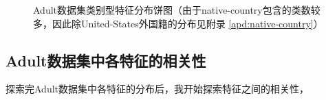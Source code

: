 \documentclass[12pt,a4paper]{article}
\theoremstyle{definition}
\begin{document}
\begin{figure}[H]
	\centering
	\caption{Adult数据集类别型特征分布饼图（由于native-country包含的类数较多，因此除United-States外国籍的分布见附录 \ref{apd:native-country}）}
	\label{fig:class_feature_dis2}
\end{figure}

\subsection{Adult数据集中各特征的相关性}

探索完Adult数据集中各特征的分布后，我开始探索特征之间的相关性，
\end{document}
